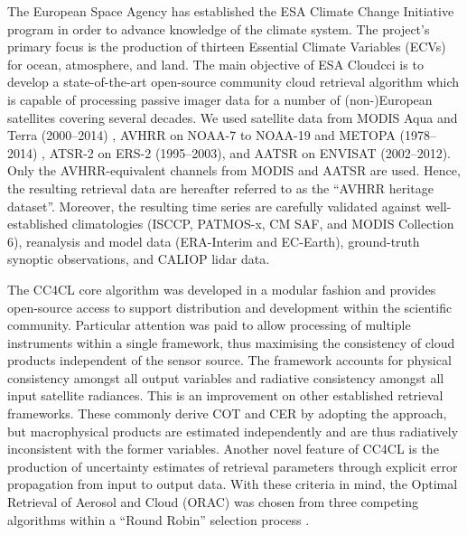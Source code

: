 The European Space Agency has established the ESA Climate Change Initiative program \citep{ESA_CCI_web,Hollmann13} in order to advance knowledge of the climate system. The project's primary focus is the production of thirteen Essential Climate Variables (ECVs) for ocean, atmosphere, and land. The main objective of ESA Cloud\textunderscore cci is to develop a state-of-the-art open-source community cloud retrieval algorithm which is capable of processing passive imager data for a number of \mbox{(non-)European} satellites covering several decades. We used satellite data from MODIS Aqua and Terra (2000--2014) \citep{King92}, AVHRR on NOAA-7 to NOAA-19 and METOPA (1978--2014) \citep{Jacobowitz03}, ATSR-2 on ERS-2 (1995--2003), and AATSR on ENVISAT (2002--2012). Only the AVHRR-equivalent channels from MODIS and AATSR are used. Hence, the resulting retrieval data are hereafter referred to as the ``AVHRR heritage dataset''. Moreover, the resulting time series are carefully validated against well-established climatologies (ISCCP, PATMOS-x, CM SAF, and MODIS Collection 6), reanalysis and model data (ERA-Interim and EC-Earth), ground-truth synoptic observations, and CALIOP lidar data.

The CC4CL core algorithm was developed in a modular fashion and provides open-source access to support distribution and development within the scientific community. Particular attention was paid to allow processing of multiple instruments within a single framework, thus maximising the consistency of cloud products independent of the sensor source. The framework accounts for physical consistency amongst all output variables and radiative consistency amongst all input satellite radiances. This is an improvement on other established retrieval frameworks. These commonly derive COT and CER by adopting the \citet{Nakajima90} approach, but macrophysical products are estimated independently and are thus radiatively inconsistent with the former variables. Another novel feature of CC4CL is the production of uncertainty estimates of retrieval parameters through explicit error propagation from input to output data. With these criteria in mind, the Optimal Retrieval of Aerosol and Cloud (ORAC) \citep{Thomas09, Poulsen12} was chosen from three competing algorithms within a ``Round Robin'' selection process \citep{Stengel15}.

